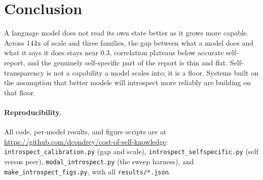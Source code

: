 \documentclass[10pt,twocolumn]{article}
\begin{document}
\section{Conclusion}
A language model does not read its own state better as it grows more capable. Across 144x of scale and three
families, the gap between what a model does and what it says it does stays near 0.3, correlation plateaus
below accurate self-report, and the genuinely self-specific part of the report is thin and flat.
Self-transparency is not a capability a model scales into; it is a floor. Systems built on the assumption
that better models will introspect more reliably are building on that floor.

\paragraph{Reproducibility.}\label{sec:repro} All code, per-model results, and figure scripts are at
\url{https://github.com/dcondrey/cost-of-self-knowledge}: \texttt{introspect\_calibration.py} (gap and
scale), \texttt{introspect\_selfspecific.py} (self versus peer), \texttt{modal\_introspect.py} (the sweep
harness), and \texttt{make\_introspect\_figs.py}, with all \texttt{results/*.json}.



\end{document}
